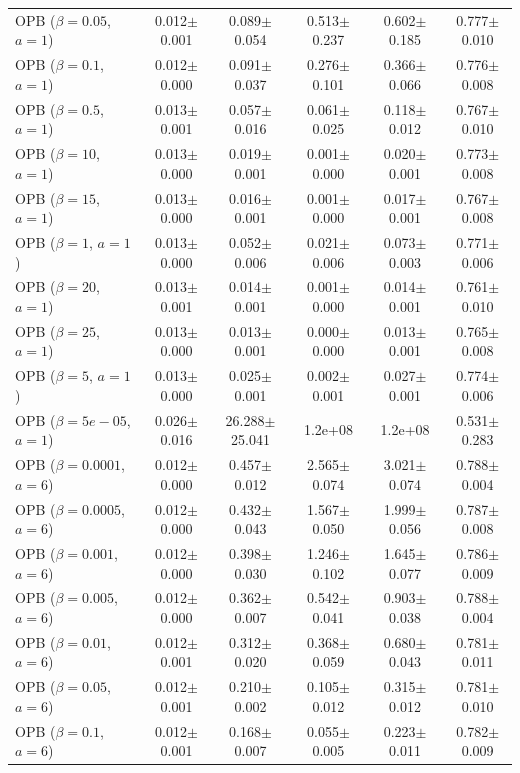 \begin{table}[t]
{\begin{tabular}{l c c c c c}
OPB ($\beta=0.05$, $a=1$) & 0.012$\pm$0.001 & 0.089$\pm$0.054 & 0.513$\pm$0.237 & 0.602$\pm$0.185 & 0.777$\pm$0.010 \\
OPB ($\beta=0.1$, $a=1$) & 0.012$\pm$0.000 & 0.091$\pm$0.037 & 0.276$\pm$0.101 & 0.366$\pm$0.066 & 0.776$\pm$0.008 \\
OPB ($\beta=0.5$, $a=1$) & 0.013$\pm$0.001 & 0.057$\pm$0.016 & 0.061$\pm$0.025 & 0.118$\pm$0.012 & 0.767$\pm$0.010 \\
OPB ($\beta=10$, $a=1$) & 0.013$\pm$0.000 & 0.019$\pm$0.001 & 0.001$\pm$0.000 & 0.020$\pm$0.001 & 0.773$\pm$0.008 \\
OPB ($\beta=15$, $a=1$) & 0.013$\pm$0.000 & 0.016$\pm$0.001 & 0.001$\pm$0.000 & 0.017$\pm$0.001 & 0.767$\pm$0.008 \\
OPB ($\beta=1$, $a=1$) & 0.013$\pm$0.000 & 0.052$\pm$0.006 & 0.021$\pm$0.006 & 0.073$\pm$0.003 & 0.771$\pm$0.006 \\
OPB ($\beta=20$, $a=1$) & 0.013$\pm$0.001 & 0.014$\pm$0.001 & 0.001$\pm$0.000 & 0.014$\pm$0.001 & 0.761$\pm$0.010 \\
OPB ($\beta=25$, $a=1$) & 0.013$\pm$0.000 & 0.013$\pm$0.001 & 0.000$\pm$0.000 & 0.013$\pm$0.001 & 0.765$\pm$0.008 \\
OPB ($\beta=5$, $a=1$) & 0.013$\pm$0.000 & 0.025$\pm$0.001 & 0.002$\pm$0.001 & 0.027$\pm$0.001 & 0.774$\pm$0.006 \\
OPB ($\beta=5e-05$, $a=1$) & 0.026$\pm$0.016 & 26.288$\pm$25.041 & 1.2e+08 & 1.2e+08 & 0.531$\pm$0.283 \\
OPB ($\beta=0.0001$, $a=6$) & 0.012$\pm$0.000 & 0.457$\pm$0.012 & 2.565$\pm$0.074 & 3.021$\pm$0.074 & 0.788$\pm$0.004 \\
OPB ($\beta=0.0005$, $a=6$) & 0.012$\pm$0.000 & 0.432$\pm$0.043 & 1.567$\pm$0.050 & 1.999$\pm$0.056 & 0.787$\pm$0.008 \\
OPB ($\beta=0.001$, $a=6$) & 0.012$\pm$0.000 & 0.398$\pm$0.030 & 1.246$\pm$0.102 & 1.645$\pm$0.077 & 0.786$\pm$0.009 \\
OPB ($\beta=0.005$, $a=6$) & 0.012$\pm$0.000 & 0.362$\pm$0.007 & 0.542$\pm$0.041 & 0.903$\pm$0.038 & 0.788$\pm$0.004 \\
OPB ($\beta=0.01$, $a=6$) & 0.012$\pm$0.001 & 0.312$\pm$0.020 & 0.368$\pm$0.059 & 0.680$\pm$0.043 & 0.781$\pm$0.011 \\
OPB ($\beta=0.05$, $a=6$) & 0.012$\pm$0.001 & 0.210$\pm$0.002 & 0.105$\pm$0.012 & 0.315$\pm$0.012 & 0.781$\pm$0.010 \\
OPB ($\beta=0.1$, $a=6$) & 0.012$\pm$0.001 & 0.168$\pm$0.007 & 0.055$\pm$0.005 & 0.223$\pm$0.011 & 0.782$\pm$0.009 \\

\end{tabular}}
\end{table}
